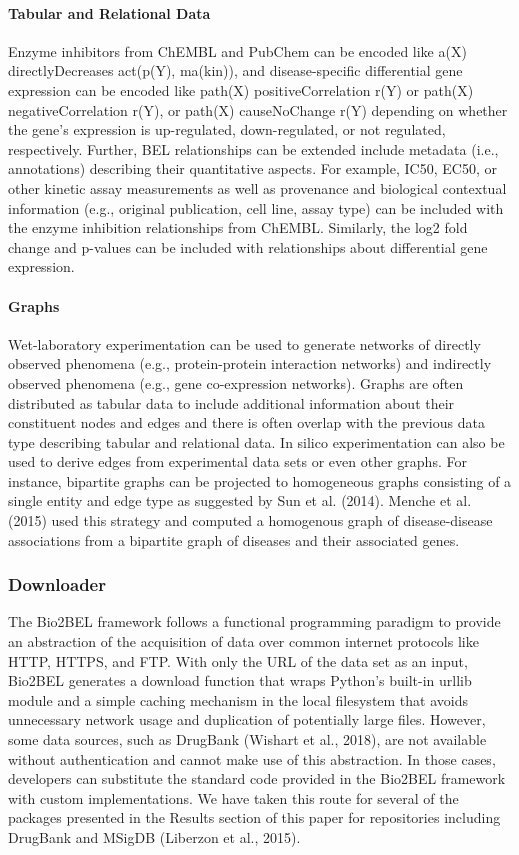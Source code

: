 \paragraph*{Tabular and Relational Data}

Enzyme inhibitors from ChEMBL and PubChem can be encoded like a(X) directlyDecreases act(p(Y), ma(kin)), and disease-specific differential gene expression can be encoded like path(X) positiveCorrelation r(Y) or path(X) negativeCorrelation r(Y), or path(X) causeNoChange r(Y) depending on whether the gene's expression is up-regulated, down-regulated, or not regulated, respectively.
Further, BEL relationships can be extended include metadata (i.e., annotations) describing their quantitative aspects.
For example, IC50, EC50, or other kinetic assay measurements as well as provenance and biological contextual information (e.g., original publication, cell line, assay type) can be included with the enzyme inhibition relationships from ChEMBL\@.
Similarly, the log2 fold change and p-values can be included with relationships about differential gene expression.

\paragraph*{Graphs}
Wet-laboratory experimentation can be used to generate networks of directly observed phenomena (e.g., protein-protein interaction networks) and indirectly observed phenomena (e.g., gene co-expression networks).
Graphs are often distributed as tabular data to include additional information about their constituent nodes and edges and there is often overlap with the previous data type describing tabular and relational data.
In silico experimentation can also be used to derive edges from experimental data sets or even other graphs.
For instance, bipartite graphs can be projected to homogeneous graphs consisting of a single entity and edge type as suggested by Sun et al. (2014).
Menche et al. (2015) used this strategy and computed a homogenous graph of disease-disease associations from a bipartite graph of diseases and their associated genes.

\subsubsection*{Downloader}
The Bio2BEL framework follows a functional programming paradigm to provide an abstraction of the acquisition of data over common internet protocols like HTTP, HTTPS, and FTP.
With only the URL of the data set as an input, Bio2BEL generates a download function that wraps Python's built-in urllib module and a simple caching mechanism in the local filesystem that avoids unnecessary network usage and duplication of potentially large files.
However, some data sources, such as DrugBank (Wishart et al., 2018), are not available without authentication and cannot make use of this abstraction. In those cases, developers can substitute the standard code provided in the Bio2BEL framework with custom implementations.
We have taken this route for several of the packages presented in the Results section of this paper for repositories including DrugBank and MSigDB (Liberzon et al., 2015).

